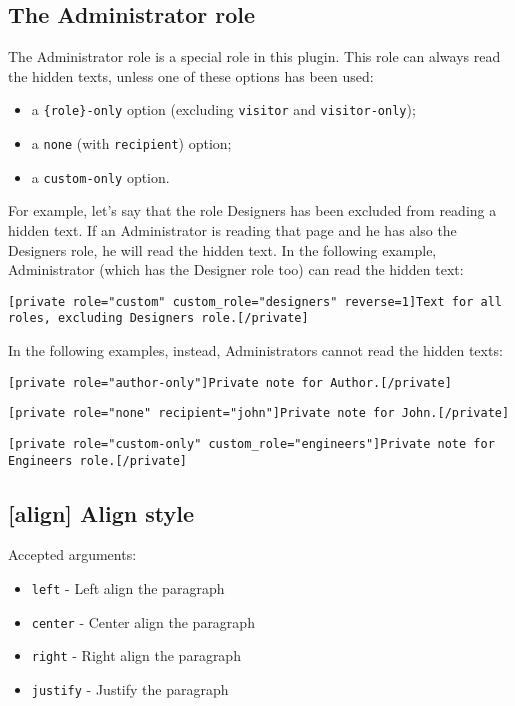 \documentclass[
	titlepage,
	headinclude,
	abstract=on,
	paper=a4,
	fontsize=11pt,
]{scrartcl}
\begin{document}
\subsection{The Administrator role}

The Administrator role is a special role in this plugin. This role can always read the hidden texts, unless one of these options has been used:

\begin{itemize}
 \item a \verb+{role}-only+ option (excluding \verb+visitor+ and \verb+visitor-only+);
 \item a \verb+none+ (with \verb+recipient+) option;
 \item a \verb+custom-only+ option.
\end{itemize}

For example, let's say that the role Designers has been excluded from reading a hidden text. If an Administrator is reading that page and he has also the Designers role, he will read the hidden text. In the following example, Administrator (which has the Designer role too) can read the hidden text:

\begin{lstlisting}
[private role="custom" custom_role="designers" reverse=1]Text for all roles, excluding Designers role.[/private]
\end{lstlisting}

In the following examples, instead, Administrators cannot read the hidden texts:

\begin{lstlisting}
[private role="author-only"]Private note for Author.[/private]
\end{lstlisting}

\begin{lstlisting}
[private role="none" recipient="john"]Private note for John.[/private]
\end{lstlisting}

\begin{lstlisting}
[private role="custom-only" custom_role="engineers"]Private note for Engineers role.[/private]
\end{lstlisting}

\subsection{[align] Align style}

Accepted arguments:

\begin{itemize}
 \item \verb+left+ - Left align the paragraph
 \item \verb+center+ - Center align the paragraph
 \item \verb+right+ - Right align the paragraph
 \item \verb+justify+ - Justify the paragraph
\end{itemize}
\end{document}
